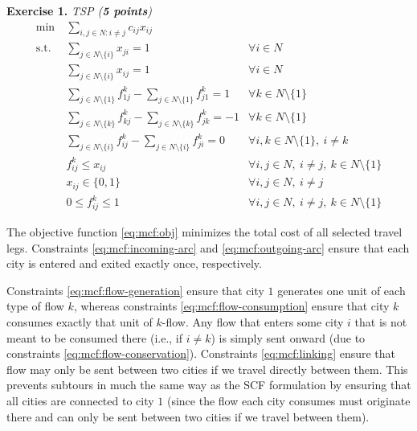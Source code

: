 \documentclass[a4paper]{scrartcl}
\newcounter{exc}
\newenvironment{exercise}[1]%
{\refstepcounter{exc}\textbf{Exercise 1.\arabic{exc}} \emph{#1}\\}
{

\hrulefill\medskip}%
\theoremstyle{definition}
\begin{document}
\begin{exercise}{TSP (\textbf{5 points})}
	\begin{align}
		\min\ & \sum_{i,j \in N: i \neq j} c_{ij} x_{ij} \label{eq:mcf:obj} \\
		\text{s.t.}\ & \sum_{j \in N \setminus \{i\}} x_{ji} = 1 \label{eq:mcf:incoming-arc} & \forall i \in N \\
		& \sum_{j \in N \setminus \{i\}} x_{ij} = 1 & \forall i \in N \label{eq:mcf:outgoing-arc} \\
		& \sum_{j \in N \setminus \{1\}} f_{1j}^k - \sum_{j \in N \setminus \{1\}} f_{j1}^k = 1 & \forall k \in N \setminus \{1\} \label{eq:mcf:flow-generation} \\
		& \sum_{j \in N \setminus \{k\}} f_{kj}^k - \sum_{j \in N \setminus \{k\}} f_{jk}^k = -1 & \forall k \in N \setminus \{1\} \label{eq:mcf:flow-consumption} \\
		& \sum_{j \in N \setminus \{i\}} f_{ij}^k - \sum_{j \in N \setminus \{i\}} f_{ji}^k = 0 & \forall i,k \in N \setminus \{1\},\ i \neq k \label{eq:mcf:flow-conservation} \\
		& f_{ij}^k \leq x_{ij} & \forall i,j \in N,\ i \neq j,\ k \in N \setminus \{1\} \label{eq:mcf:linking} \\
		& x_{ij} \in \{0, 1\} & \forall i,j \in N,\ i \neq j \label{eq:mcf:x-domain} \\
		& 0 \leq f_{ij}^k \leq 1 & \forall i,j \in N,\ i \neq j,\ k \in N \setminus \{1\} \label{eq:mcf:f-domain}
	\end{align}
	
	The objective function \eqref{eq:mcf:obj} minimizes the total cost of all selected travel legs.
	Constraints \eqref{eq:mcf:incoming-arc} and \eqref{eq:mcf:outgoing-arc} ensure that each city is entered and exited exactly once, respectively.
	
	Constraints \eqref{eq:mcf:flow-generation} ensure that city $1$ generates one unit of each type of flow $k$, whereas constraints \eqref{eq:mcf:flow-consumption} ensure that city $k$ consumes exactly that unit of $k$-flow.
	Any flow that enters some city $i$ that is not meant to be consumed there (i.e., if $i \neq k$) is simply sent onward (due to constraints \eqref{eq:mcf:flow-conservation}).
	Constraints \eqref{eq:mcf:linking} ensure that flow may only be sent between two cities if we travel directly between them.
	This prevents subtours in much the same way as the SCF formulation by ensuring that all cities are connected to city $1$ (since the flow each city consumes must originate there and can only be sent between two cities if we travel between them).
	

\end{exercise}
\end{document}
